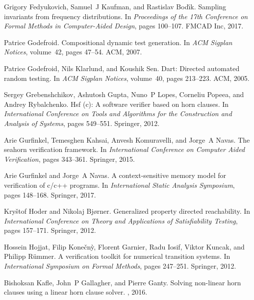 \begin{thebibliography}{10}
Grigory Fedyukovich, Samuel~J Kaufman, and Rastislav Bod{\'\i}k.
\newblock Sampling invariants from frequency distributions.
\newblock In {\em Proceedings of the 17th Conference on Formal Methods in
  Computer-Aided Design}, pages 100--107. FMCAD Inc, 2017.

Patrice Godefroid.
\newblock Compositional dynamic test generation.
\newblock In {\em ACM Sigplan Notices}, volume~42, pages 47--54. ACM, 2007.

Patrice Godefroid, Nils Klarlund, and Koushik Sen.
\newblock Dart: Directed automated random testing.
\newblock In {\em ACM Sigplan Notices}, volume~40, pages 213--223. ACM, 2005.

Sergey Grebenshchikov, Ashutosh Gupta, Nuno~P Lopes, Corneliu Popeea, and
  Andrey Rybalchenko.
\newblock Hsf (c): A software verifier based on horn clauses.
\newblock In {\em International Conference on Tools and Algorithms for the
  Construction and Analysis of Systems}, pages 549--551. Springer, 2012.

Arie Gurfinkel, Temesghen Kahsai, Anvesh Komuravelli, and Jorge~A Navas.
\newblock The seahorn verification framework.
\newblock In {\em International Conference on Computer Aided Verification},
  pages 343--361. Springer, 2015.

Arie Gurfinkel and Jorge~A Navas.
\newblock A context-sensitive memory model for verification of c/c++ programs.
\newblock In {\em International Static Analysis Symposium}, pages 148--168.
  Springer, 2017.

Kry{\v{s}}tof Hoder and Nikolaj Bj{\o}rner.
\newblock Generalized property directed reachability.
\newblock In {\em International Conference on Theory and Applications of
  Satisfiability Testing}, pages 157--171. Springer, 2012.

Hossein Hojjat, Filip Kone{\v{c}}n{\`y}, Florent Garnier, Radu Iosif, Viktor
  Kuncak, and Philipp R{\"u}mmer.
\newblock A verification toolkit for numerical transition systems.
\newblock In {\em International Symposium on Formal Methods}, pages 247--251.
  Springer, 2012.

Bishoksan Kafle, John~P Gallagher, and Pierre Ganty.
\newblock Solving non-linear horn clauses using a linear horn clause solver.
, 2016.


\end{thebibliography}
